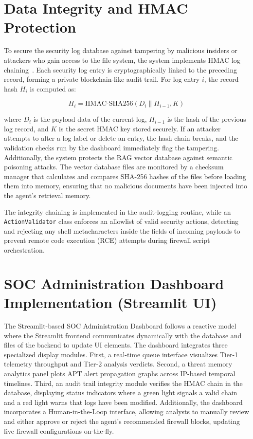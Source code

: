 \section{Data Integrity and HMAC Protection}

To secure the security log database against tampering by malicious insiders or attackers who gain access to the file system, the system implements HMAC log chaining~\cite{hmac1997}. Each security log entry is cryptographically linked to the preceding record, forming a private blockchain-like audit trail. For log entry $i$, the record hash $H_i$ is computed as:

\begin{equation}
    H_i = \text{HMAC-SHA256}(D_i \parallel H_{i-1}, K)
\end{equation}

where $D_i$ is the payload data of the current log, $H_{i-1}$ is the hash of the previous log record, and $K$ is the secret HMAC key stored securely. If an attacker attempts to alter a log label or delete an entry, the hash chain breaks, and the validation checks run by the dashboard immediately flag the tampering. Additionally, the system protects the RAG vector database against semantic poisoning attacks. The vector database files are monitored by a checksum manager that calculates and compares SHA-256 hashes of the files before loading them into memory, ensuring that no malicious documents have been injected into the agent's retrieval memory.

The integrity chaining is implemented in the audit-logging routine, while an \texttt{ActionValidator} class enforces an allowlist of valid security actions, detecting and rejecting any shell metacharacters inside the fields of incoming payloads to prevent remote code execution (RCE) attempts during firewall script orchestration.

\section{SOC Administration Dashboard Implementation (Streamlit UI)}

The Streamlit-based SOC Administration Dashboard follows a reactive model where the Streamlit frontend communicates dynamically with the database and files of the backend to update UI elements. The dashboard integrates three specialized display modules. First, a real-time queue interface visualizes Tier-1 telemetry throughput and Tier-2 analysis verdicts. Second, a threat memory analytics panel plots APT alert propagation graphs across IP-based temporal timelines. Third, an audit trail integrity module verifies the HMAC chain in the database, displaying status indicators where a green light signals a valid chain and a red light warns that logs have been modified. Additionally, the dashboard incorporates a Human-in-the-Loop interface, allowing analysts to manually review and either approve or reject the agent's recommended firewall blocks, updating live firewall configurations on-the-fly.


